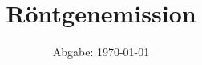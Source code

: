 

\subject{Versuchsnummer: 602}
\title{Röntgenemission}
\date{
  Abgabe: \today
}



\maketitle
\thispagestyle{empty}
\tableofcontents
\newpage




\newpage
\nocite{*}
\printbibliography
\newpage



